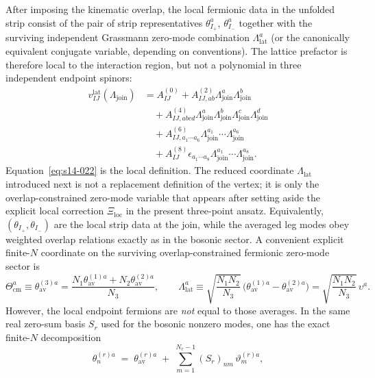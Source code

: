 \documentclass[11pt]{article}
\numberwithin{equation}{section}
\begin{document}
After imposing the kinematic overlap, the local fermionic data in the unfolded strip consist of the pair of strip representatives $\theta_{I_+}^a$, $\theta_{I_-}^a$ together with the surviving independent Grassmann zero-mode combination $\Lambda_{\mathrm{lat}}^a$ (or the canonically equivalent conjugate variable, depending on conventions). The lattice prefactor is therefore local to the interaction region, but not a polynomial in three independent endpoint spinors:
\begin{equation}
\label{eq:s14-022}
\begin{aligned}
v_{IJ}^{\mathrm{lat}}(\Lambda_{\mathrm{join}})
&= 
A^{(0)}_{IJ}
+A^{(2)}_{IJ,ab}\Lambda_{\mathrm{join}}^a\Lambda_{\mathrm{join}}^b\\
&\quad
+A^{(4)}_{IJ,abcd}\Lambda_{\mathrm{join}}^a\Lambda_{\mathrm{join}}^b
                        \Lambda_{\mathrm{join}}^c\Lambda_{\mathrm{join}}^d\\
&\quad
+A^{(6)}_{IJ,a_1\cdots a_6}\Lambda_{\mathrm{join}}^{a_1}\cdots\Lambda_{\mathrm{join}}^{a_6}\\
&\quad
+A^{(8)}_{IJ}\epsilon_{a_1\cdots a_8}\Lambda_{\mathrm{join}}^{a_1}\cdots\Lambda_{\mathrm{join}}^{a_8}.
\end{aligned}
\end{equation}
Equation~\eqref{eq:s14-022} is the local definition. The reduced coordinate $\Lambda_{\mathrm{lat}}$ introduced next is not a replacement definition of the vertex; it is only the overlap-constrained zero-mode variable that appears after setting aside the explicit local correction $\Xi_{\mathrm{loc}}$ in the present three-point ansatz.
Equivalently, $(\theta_{I_+},\theta_{I_-})$ are the local strip data at the join, while the averaged leg modes obey weighted overlap relations exactly as in the bosonic sector. A convenient explicit finite-$N$ coordinate on the surviving overlap-constrained fermionic zero-mode sector is
\begin{equation}
\label{eq:s14-023}
\Theta_{\mathrm{cm}}^a\equiv \theta_{\mathrm{av}}^{(3)a}
=
\frac{N_1\theta_{\mathrm{av}}^{(1)a}+N_2\theta_{\mathrm{av}}^{(2)a}}{N_3},
\qquad
\Lambda_{\mathrm{lat}}^a
\equiv
\sqrt{\frac{N_1N_2}{N_3}}\,
\bigl(\theta_{\mathrm{av}}^{(1)a}-\theta_{\mathrm{av}}^{(2)a}\bigr)
=
\sqrt{\frac{N_1N_2}{N_3}}\,\upsilon^a.
\end{equation}
However, the local endpoint fermions are \emph{not} equal to those averages. In the same real zero-sum basis $S_r$ used for the bosonic nonzero modes, one has the exact finite-$N$ decomposition
\begin{equation}
\label{eq:s14-023a}
\theta_n^{(r)a}
\;=\;
\theta_{\mathrm{av}}^{(r)a}
\;+\;
\sum_{m=1}^{N_r-1}(S_r)_{nm}\,\vartheta_m^{(r)a},
\end{equation}
\end{document}
